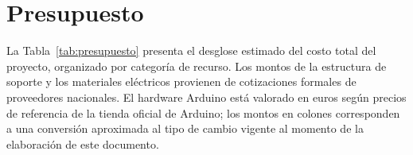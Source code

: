 \documentclass[12pt,a4paper,oneside]{report}
\begin{document}

\appendix

\chapter{Presupuesto}
\label{chp:presupuesto}

La Tabla~\ref{tab:presupuesto} presenta el desglose estimado del costo total del proyecto, organizado por categoría de recurso. Los montos de la estructura de soporte y los materiales eléctricos provienen de cotizaciones formales de proveedores nacionales. El hardware Arduino está valorado en euros según precios de referencia de la tienda oficial de Arduino; los montos en colones corresponden a una conversión aproximada al tipo de cambio vigente al momento de la elaboración de este documento.
\end{document}

